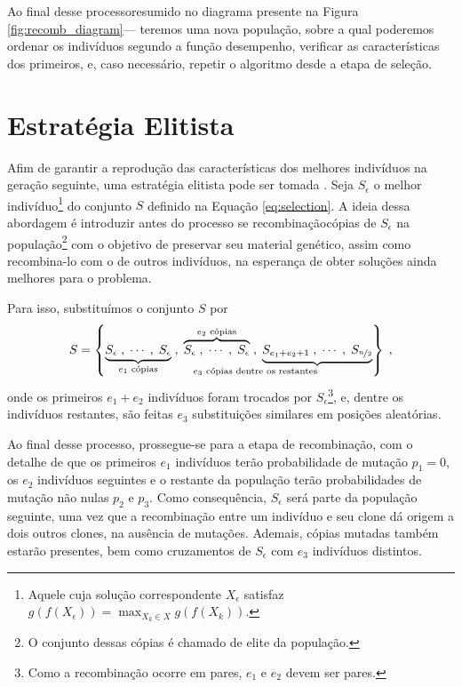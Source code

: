 Ao final desse processo\trav resumido no diagrama presente na Figura \ref{fig:recomb_diagram}\;---
teremos uma nova população, sobre a qual poderemos ordenar os indivíduos segundo a função desempenho, verificar
as características dos primeiros, e, caso necessário, repetir o algoritmo desde a etapa de seleção.

\section{Estratégia Elitista}

Afim de garantir a reprodução das características dos melhores indivíduos na geração seguinte, uma
estratégia elitista pode ser tomada \cite{goldberg1989ga} \cite{roncaratti2006ga}.
Seja $S_{\epsilon}$ o melhor indivíduo\footnote{
  Aquele cuja solução correspondente $X_{\epsilon}$ satisfaz $ g(f(X_{\epsilon})) = \max_{X_k \in X} g(f(X_k)) $.
}
do conjunto $S$ definido na Equação \ref{eq:selection}. A ideia dessa abordagem é introduzir\trav
antes do processo se recombinação\trav cópias de $S_{\epsilon}$ na população\footnote{
  O conjunto dessas cópias é chamado de elite da população.
}
com o objetivo de preservar seu material genético, assim como recombina-lo com o de outros indivíduos, na esperança
de obter soluções ainda melhores para o problema.

Para isso, substituímos o conjunto $S$ por
\begin{equation}
  S =
  \left\{
  \underbrace{S_{\epsilon}\;, \mathdots,  \;S_{\epsilon}}_{e_1 \text{ cópias}}\;,\;
  \overbrace{S_{\epsilon}\;, \mathdots,  \;S_{\epsilon}}^{e_2 \text{ cópias}}\;,\;
  \underbrace{S_{e_1 + e_2 + 1}\;, \mathdots,  \;S_{\nicefrac{n}{2}}}_{\mathllap{e_3 \text{ cópias dentre os restantes}}}
  \right\}
  \mathcomma
\end{equation}
onde os primeiros $e_1 + e_2$ indivíduos foram trocados por $S_{\epsilon}$\footnote{
  Como a recombinação ocorre em pares, $e_1$ e $e_2$ devem ser pares.
}, e, dentre os indivíduos restantes,
são feitas $e_3$ substituições similares em posições aleatórias.

Ao final desse processo, prossegue-se para a etapa de recombinação, com o detalhe de que os primeiros $e_1$
indivíduos terão probabilidade de mutação $p_1 = 0$, os $e_2$ indivíduos seguintes e o restante da população
terão probabilidades de mutação não nulas $p_2$ e $p_3$.
Como consequência, $S_{\epsilon}$ será parte da população seguinte, uma vez que a recombinação entre um
indivíduo e seu clone dá origem a dois outros clones, na ausência de mutações. Ademais, cópias mutadas
também estarão presentes, bem como cruzamentos de $S_{\epsilon}$ com $e_3$ indivíduos distintos.